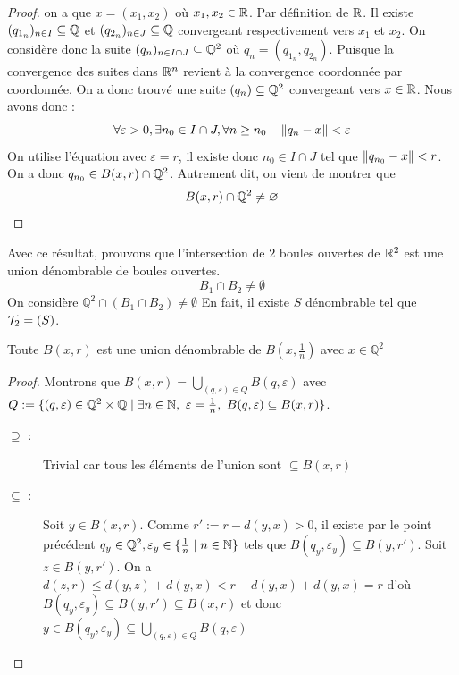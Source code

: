 \begin{proof}
on a que $x=(x_1,x_2)$ où $x_1,x_2\in \mathbb{R}$. Par définition de $\mathbb{R}$. Il existe $(q_{1_n})_{n\in I}\subseteq \mathbb{Q}$ et $(q_{2_n})_{ n\in J }\subseteq \mathbb{Q}$ convergeant respectivement vers $x_1$ et $x_2$. On considère donc la suite $(q_n)_{n\in I\cap J}\subseteq \mathbb{Q}^2$ où $q_n=(q_{1_n},q_{2_n})$. Puisque la convergence des suites dans $\mathbb{R}^n$ revient à la convergence coordonnée par coordonnée. On a donc trouvé une suite $(q_n)\subseteq \mathbb{Q}^2$ convergeant vers $x\in\mathbb{R}$. Nous avons donc :
\begin{equation*}
    \forall\varepsilon>0, \exists n_0\in I\cap J, \forall n\geq n_0 \quad \left\| q_n-x \right\|<\varepsilon
\end{equation*}
On utilise l'équation avec $\varepsilon=r$, il existe donc $n_0\in I\cap J$ tel que $\left\| q_{n_0}-x \right\|< r$. On a donc $q_{n_0}\in B(x,r)\cap \mathbb{Q}^2$. Autrement dit, on vient de montrer que 
\[
B(x,r)\cap \mathbb{Q}^2\neq \varnothing
\]
\end{proof}

Avec ce résultat, prouvons que l'intersection de $2$ boules ouvertes de $\mathbb{R}^2$ est une union dénombrable de boules ouvertes.
\[
B_1\cap B_2\neq \emptyset
\]
On considère
$\mathbb{Q}^2\cap (B_1\cap B_2)\neq \emptyset$
En fait, il existe $S$ dénombrable tel que $\mathcal{T}_2=(S)$. \begin{proposition}
    Toute $B(x,r)$ est une union dénombrable de $B\left(x, \frac{1}{n}\right)$ avec $x\in \mathbb{Q}^2 $
\end{proposition}
\begin{proof}
    Montrons que $B(x,r)= \bigcup_{(q,\varepsilon)\in Q}B(q,\varepsilon)$ avec $Q:=\{(q,\varepsilon)\in\mathbb{Q}^2\times \mathbb{Q}\mid \exists n\in\mathbb{N},\ \varepsilon=\frac 1 n ,\ B(q,\varepsilon)\subseteq B(x,r)\}$.
    \begin{description}
        \item[$\supseteq$ : ]Trivial car tous les éléments de l'union sont $\subseteq B(x,r)$
        \item[$\subseteq$ : ]Soit $y\in B(x,r)$. Comme $r':= r-d(y,x)>0$, il existe par le point précédent $q_y\in \mathbb{Q}^2,\varepsilon_y\in\{\frac 1 n\mid n\in\mathbb{N}\}$ tels que $B(q_y,\varepsilon_y)\subseteq B(y,r')$. Soit $z\in B(y,r')$. On a $d(z,r)\leq d(y,z)+d(y,x)<r-d(y,x)+d(y,x) = r$ d'où $B(q_y,\varepsilon_y)\subseteq B(y,r')\subseteq B(x,r)$ et donc $y\in B(q_y,\varepsilon_y)\subseteq \bigcup_{(q,\varepsilon)\in Q}B(q,\varepsilon)$
    \end{description}
\end{proof}


